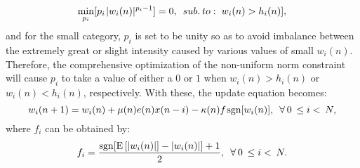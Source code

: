 \vspace{-1cm}
\begin{eqnarray}
\min_{p_i}[p_{i}\hspace{1pt}|w_{i}(n)|^{p_{i}-1}]=0,  \hspace{5pt}     sub. \hspace{2pt} to: \hspace{3pt}   w_{i}(n)>h_i(n)],\label{eq20}\vspace{-0.6cm}
\end{eqnarray}
\noindent and for the small category, $p_{i}$ is set to be unity so as to avoid imbalance between the extremely great or slight intensity caused by various
values of small $w_i(n)$. Therefore, the comprehensive optimization of the non-uniform norm constraint will cause $p_i$ to take a value of either a
$0$ or $1$ when $w_i(n)>h_i(n)$  or  $w_i(n)<h_i(n)$,  respectively. With these, the update equation becomes:
\vspace{-0.1cm}
\begin{equation}
w_{i}(n+1)= w_{i}(n)+\mu(n)e(n)x(n-i)- \kappa(n) f\hspace{1pt} \mathrm{sgn}[w_{i}(n)],\hspace{5pt}\forall \hspace{2pt}0\hspace{2pt}\leq i<\hspace{2pt}N, \label{eq21}\vspace{-0.1cm}
\end{equation}
\noindent where $f_{i}$ can be obtained by:
\vspace{-0.1cm}
\begin{equation}
f_{i}=\frac{\mathrm{sgn}[\mathrm{E}\left[|w_{i}(n)|\right]-|w_{i}(n)|] + 1}{2},\hspace{5pt} \forall\hspace{2pt} 0\hspace{2pt}\leq i<\hspace{2pt}N. \label{eq22}\vspace{-0.1cm}
\end{equation}
